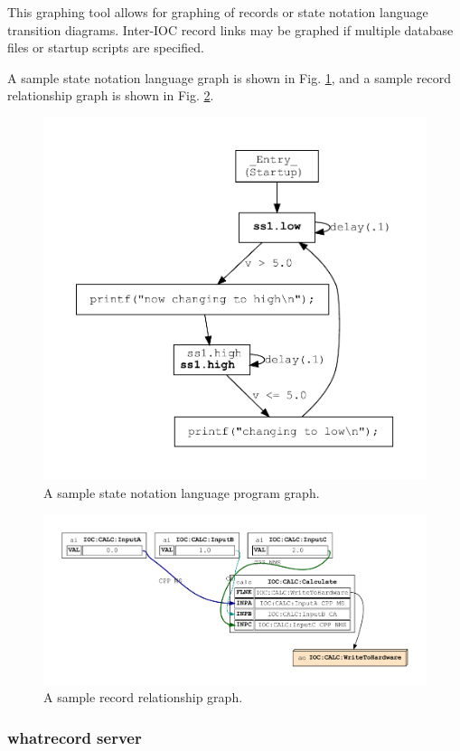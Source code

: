 \documentclass[letter,
               keeplastbox,   %
               ]{jacow}
\begin{document}
This graphing tool allows for graphing of records or state notation language
transition diagrams. Inter-IOC record links may be graphed if multiple
database files or startup scripts are specified.

A sample state notation language graph is shown in Fig. \ref{fig:simple.st},
and a sample record relationship graph is shown in Fig. \ref{fig:records}.

\begin{figure}
   \centering
   \includegraphics*[width=.7\columnwidth]{st-simple}
   \caption{A sample state notation language program graph.}
   \label{fig:simple.st}
\end{figure}

\begin{figure}
   \centering
   \includegraphics*[width=.9\columnwidth]{calc-records}
   \caption{A sample record relationship graph.}
   \label{fig:records}
\end{figure}

\subsubsection{whatrecord server}
\end{document}
